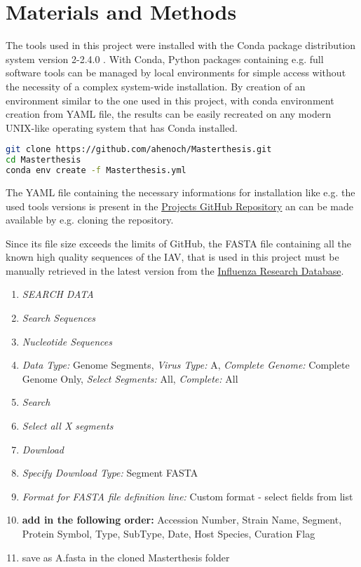 \chapter{Materials and Methods} \label{chap:Materials_and_Methods}

The tools used in this project were installed with the Conda package distribution system version 2-2.4.0 \autocite{anaconda_software_distribution_anaconda_2020}. With Conda, Python packages containing e.g. full software tools can be managed by local environments for simple access without the necessity of a complex system-wide installation. By creation of an environment similar to the one used in this project, with conda environment creation from YAML file, the results can be easily recreated on any modern UNIX-like operating system that has Conda installed. 

\begin{lstlisting}[language=sh]
git clone https://github.com/ahenoch/Masterthesis.git
cd Masterthesis
conda env create -f Masterthesis.yml
\end{lstlisting}  

The YAML file containing the necessary informations for installation like e.g. the used tools versions is present in the \href{https://github.com/ahenoch/Masterthesis.git}{Projects GitHub Repository} an can be made available by e.g. cloning the repository.

Since its file size exceeds the limits of GitHub, the FASTA file containing all the known high quality sequences of the \gls{IAV}, that is used in this project must be manually retrieved in the latest version from the \href{https://www.fludb.org/brc/home.spg?decorator=influenza}{Influenza Research Database}.

\begin{enumerate}[noitemsep]
    \item \textit{SEARCH DATA}
    \item \textit{Search Sequences}
    \item \textit{Nucleotide Sequences}
    \item \textit{Data Type:} Genome Segments, \textit{Virus Type:} A, \textit{Complete Genome:} Complete Genome Only, \textit{Select Segments:} All, \textit{Complete:} All
    \item \textit{Search}
    \item \textit{Select all X segments}
    \item \textit{Download}
    \item \textit{Specify Download Type:} Segment FASTA
    \item \textit{Format for FASTA file definition line:}  Custom format - select fields from list
    \item \textbf{add in the following order:} Accession Number, Strain Name, Segment, Protein Symbol, Type, SubType, Date, Host Species, Curation Flag
    \item save as A.fasta in the cloned Masterthesis folder
\end{enumerate}

